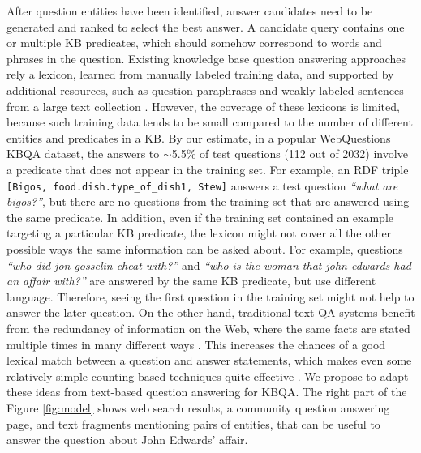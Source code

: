 After question entities have been identified, answer candidates need to be generated and ranked to select the best answer.
A candidate query contains one or multiple KB predicates, which should somehow correspond to words and phrases in the question.
Existing knowledge base question answering approaches \cite{ACCU:2015,Berant:EMNLP13,berant2014semantic,berant2015imitation,BordesCW14:emnlp,yao2014freebase} rely a lexicon, learned from manually labeled training data, and supported by additional resources, such as question paraphrases \cite{berant2014semantic} and weakly labeled sentences from a large text collection \cite{yao2014information}.
However, the coverage of these lexicons is limited, because such training data tends to be small compared to the number of different entities and predicates in a KB.
By our estimate, in a popular WebQuestions KBQA dataset, the answers to $\sim$5.5\% of test questions (112 out of 2032) involve a predicate that does not appear in the training set.
For example, an RDF triple \texttt{[Bigos, food.dish.type\_of\_dish1, Stew]} answers a test question \textit{``what are bigos?''}, but there are no questions from the training set that are answered using the same predicate.
In addition, even if the training set contained an example targeting a particular KB predicate, the lexicon might not cover all the other possible ways the same information can be asked about.
For example, questions \textit{``who did jon gosselin cheat with?''} and \textit{``who is the woman that john edwards had an affair with?''} are answered by the same KB predicate, but use different language.
Therefore, seeing the first question in the training set might not help to answer the later question.
On the other hand, traditional text-QA systems benefit from the redundancy of information on the Web, where the same facts are stated multiple times in many different ways \cite{Lin:2007:EPU:1229179.1229180}.
This increases the chances of a good lexical match between a question and answer statements, which makes even some relatively simple counting-based techniques quite effective \cite{brill2002analysis}.
We propose to adapt these ideas from text-based question answering for KBQA.
The right part of the Figure \ref{fig:model} shows web search results, a community question answering page, and text fragments mentioning pairs of entities, that can be useful to answer the question about John Edwards' affair.

